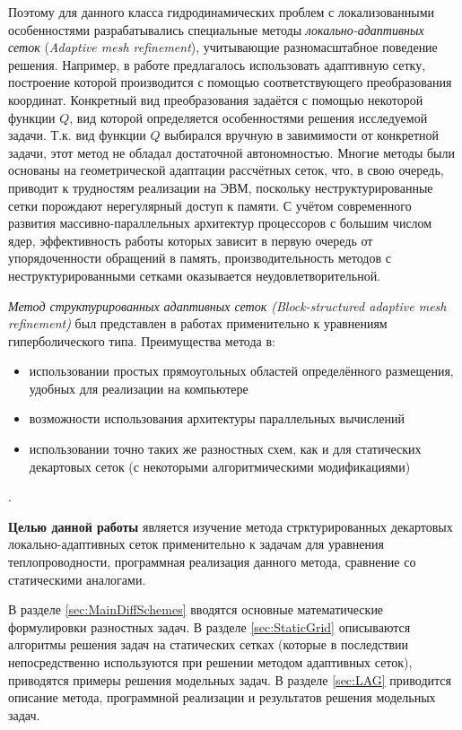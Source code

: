 Поэтому для данного класса гидродинамических проблем с локализованными особенностями разрабатывались специальные методы \emph{локально-адаптивных сеток} (\emph{Adaptive mesh refinement}), учитывающие разномасштабное поведение решения.
Например, в работе \cite{СамарскийАдаптивные} предлагалось использовать адаптивную сетку, построение которой производится с помощью соответствующего преобразования координат.
Конкретный вид преобразования задаётся с помощью некоторой функции $Q$, вид которой определяется особенностями решения исследуемой задачи.
Т.к. вид функции $Q$ выбирался вручную в завимимости от конкретной задачи, этот метод не обладал достаточной автономностью.
Многие методы были основаны на геометрической адаптации рассчётных сеток, что, в свою очередь, приводит к трудностям реализации на ЭВМ, поскольку неструктурированные сетки порождают нерегулярный доступ к памяти.
С учётом современного развития массивно-параллельных архитектур процессоров с большим числом ядер, эффективность работы которых зависит в первую очередь от упорядоченности обращений в память, производительность методов с неструктурированными сетками оказывается неудовлетворительной.

\emph{Метод структурированных адаптивных сеток (Block-structured adaptive mesh refinement)} был представлен в работах \cite{berger1982adaptive, berger1989local} применительно к уравнениям гиперболического типа.
Преимущества метода в:
\begin{itemize}
    \item использовании простых прямоугольных областей определённого размещения, удобных для реализации на компьютере
    \item возможности использования архитектуры параллельных вычислений
    \item использовании точно таких же разностных схем, как и для статических декартовых сеток (с некоторыми алгоритмическими модификациями)
\end{itemize}.

\textbf{Целью данной работы} является изучение метода стрктурированных декартовых локально-адаптивных сеток применительно к задачам для уравнения теплопроводности, программная реализация данного метода, сравнение со статическими аналогами.

В разделе \ref{sec:MainDiffSchemes} вводятся основные математические формулировки разностных задач.
В разделе \ref{sec:StaticGrid} описываются алгоритмы решения задач на статических сетках (которые в последствии непосредственно используются при решении методом адаптивных сеток), приводятся примеры решения модельных задач.
В разделе \ref{sec:LAG} приводится описание метода, программной реализации и результатов решения модельных задач.